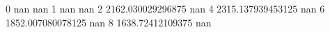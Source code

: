 0 nan nan
1 nan nan
2 2162.030029296875 nan
4 2315.137939453125 nan
6 1852.007080078125 nan
8 1638.72412109375 nan
